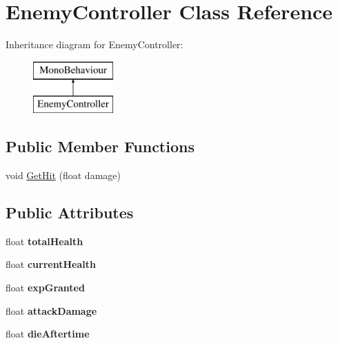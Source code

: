 \hypertarget{class_enemy_controller}{}\section{Enemy\+Controller Class Reference}
\label{class_enemy_controller}
Inheritance diagram for Enemy\+Controller\+:\begin{figure}[H]
\begin{center}
\leavevmode
\includegraphics[height=2.000000cm]{class_enemy_controller}
\end{center}
\end{figure}
\subsection*{Public Member Functions}
\begin{DoxyCompactItemize}
\item 
void \hyperlink{class_enemy_controller_a1aefc89669c41a6353ecf463c937af07}{Get\+Hit} (float damage)
\end{DoxyCompactItemize}
\subsection*{Public Attributes}
\begin{DoxyCompactItemize}
\item 
\mbox{\label{class_enemy_controller_a5c91ac8bc0f622901cb7a48ba787f0bd}} 
float {\bfseries total\+Health}
\item 
\mbox{\label{class_enemy_controller_a7af1c6ac310289274ab51a7c2893fa0b}} 
float {\bfseries current\+Health}
\item 
\mbox{\label{class_enemy_controller_ae505ed595e6b9807cddd599a50c55ad9}} 
float {\bfseries exp\+Granted}
\item 
\mbox{\label{class_enemy_controller_aac2e78d7cd1271cef258e616032cd4c7}} 
float {\bfseries attack\+Damage}
\item 
\mbox{\label{class_enemy_controller_a181f04ac7727efc9ee6d200ad19b0518}} 
float {\bfseries die\+Aftertime}
\end{DoxyCompactItemize}
